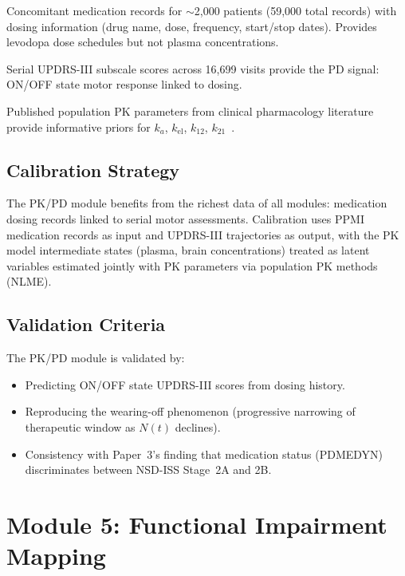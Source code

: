 \begin{description}[style=nextline]
\item[PPMI Medication Records] Concomitant medication records for $\sim$2,000 patients (59,000 total records) with dosing information (drug name, dose, frequency, start/stop dates). Provides levodopa dose schedules but not plasma concentrations.

\item[PPMI UPDRS Trajectories] Serial UPDRS-III subscale scores across 16,699 visits provide the PD signal: ON/OFF state motor response linked to dosing.

\item[Population PK Parameters] Published population PK parameters from clinical pharmacology literature provide informative priors for $k_a$, $k_\text{el}$, $k_{12}$, $k_{21}$~\cite{ursino2020}.
\end{description}

\subsection{Calibration Strategy}

The PK/PD module benefits from the richest data of all modules: medication dosing records linked to serial motor assessments. Calibration uses PPMI medication records as input and UPDRS-III trajectories as output, with the PK model intermediate states (plasma, brain concentrations) treated as latent variables estimated jointly with PK parameters via population PK methods (NLME).

\subsection{Validation Criteria}

The PK/PD module is validated by:
\begin{itemize}
\item Predicting ON/OFF state UPDRS-III scores from dosing history.
\item Reproducing the wearing-off phenomenon (progressive narrowing of therapeutic window as $N(t)$ declines).
\item Consistency with Paper~3's finding that medication status (PDMEDYN) discriminates between NSD-ISS Stage~2A and 2B.
\end{itemize}


\section{Module 5: Functional Impairment Mapping}
\label{sec:mech-functional}

